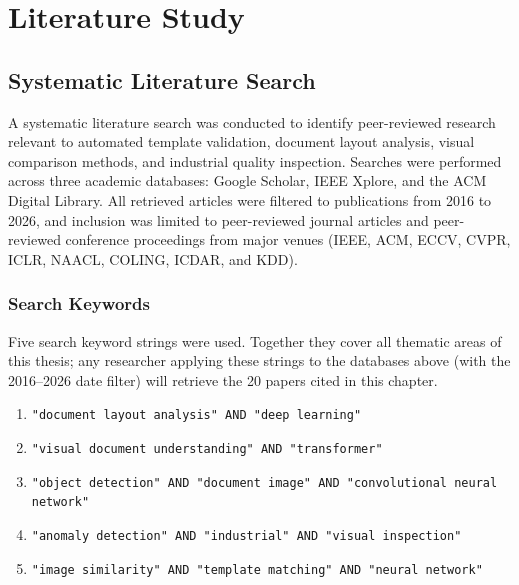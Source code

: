 \chapter{Literature Study}
\label{ch:literature}

\section{Systematic Literature Search}
\label{sec:search}

A systematic literature search was conducted to identify peer-reviewed research relevant
to automated template validation, document layout analysis, visual comparison methods,
and industrial quality inspection. Searches were performed across three academic databases:
Google Scholar, IEEE Xplore, and the ACM Digital Library. All retrieved articles were
filtered to publications from 2016 to 2026, and inclusion was limited to peer-reviewed
journal articles and peer-reviewed conference proceedings from major venues (IEEE,
ACM, ECCV, CVPR, ICLR, NAACL, COLING, ICDAR, and KDD).

\subsection{Search Keywords}

Five search keyword strings were used. Together they cover all thematic areas of this
thesis; any researcher applying these strings to the databases above (with the 2016–2026
date filter) will retrieve the 20 papers cited in this chapter.

\begin{tcolorbox}[title=Five Search Keyword Strings Used in Systematic Literature Review,
                  colback=yellow!6!white, colframe=orange!70!black]
\begin{enumerate}
  \item \texttt{"document layout analysis" AND "deep learning"}
  \item \texttt{"visual document understanding" AND "transformer"}
  \item \texttt{"object detection" AND "document image" AND "convolutional neural network"}
  \item \texttt{"anomaly detection" AND "industrial" AND "visual inspection"}
  \item \texttt{"image similarity" AND "template matching" AND "neural network"}
\end{enumerate}
\end{tcolorbox}

